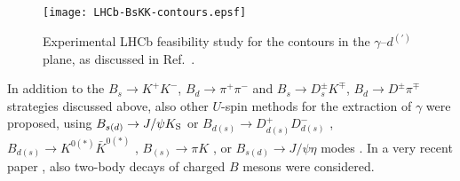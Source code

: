 \documentclass[12pt]{article}
\begin{document}
\begin{figure}
   \centering
   \texttt{[image: LHCb-BsKK-contours.epsf]} 
   \vspace*{-0.6truecm}
   \caption{Experimental LHCb feasibility study for the contours in the
   $\gamma$--$d^{(')}$ plane, as discussed in 
   Ref.~\cite{LHCb-analyses}.}\label{fig:Bs-Bd-contours-LHCb}
\end{figure}


In addition to the $B_s\to K^+K^-$, $B_d\to\pi^+\pi^-$ and
$B_s\to D_s^\pm K^\mp$, $B_d\to D^\pm \pi^\mp$ strategies discussed
above, also other $U$-spin methods for the extraction of $\gamma$ were 
proposed, using 
$B_{s(d)}\to J/\psi K_{\rm S}$ or $B_{d(s)}\to D_{d(s)}^+D_{d(s)}^-$ 
\cite{RF-BdsPsiK}, $B_{d(s)}\to K^{0(*)}\bar K^{0(*)}$ \cite{RF-Phys-Rep,RF-ang}, 
$B_{(s)}\to \pi K$ \cite{GR-BspiK}, or $B_{s(d)}\to J/\psi \eta$
modes \cite{skands}. In a very recent paper \cite{SoSu}, also two-body decays 
of charged $B$ mesons were considered.



%
%
%
\boldmath
\end{document}
